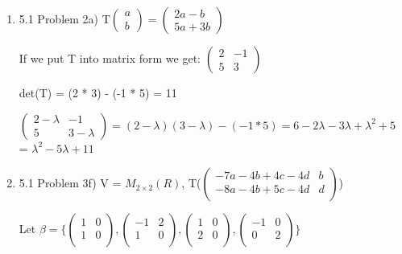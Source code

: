 \documentclass[12pt]{article}
\begin{document}
\begin{enumerate}
    [L$_A$]$_\beta$ = $\begin{pmatrix}
        3 & 0 \\
        0 & -1\\
    \end{pmatrix}$

    Q will just be the matrix form of the ordered basis vectors of $\beta$: \\
    Q = $\begin{pmatrix}
        1 & 1 \\
        1 & -1 \\
    \end{pmatrix}$
    
    \item 5.1 Problem 2a) T$\begin{pmatrix}
        a \\
        b 
    \end{pmatrix} = \begin{pmatrix}
        2a - b \\
        5a + 3b
    \end{pmatrix}$

    If we put T into matrix form we get: $\begin{pmatrix}
        2 & -1 \\
        5 & 3
    \end{pmatrix}$
    
    det(T) = (2 * 3) - (-1 * 5) = 11

    $\begin{pmatrix}
        2 - \lambda & -1 \\
        5 & 3 - \lambda
    \end{pmatrix} = (2 - \lambda)(3-\lambda) -(-1 * 5) = 6 - 2\lambda - 3\lambda + \lambda^2 + 5$ \\ = 
    $\lambda^2 - 5\lambda + 11$


    \item 5.1 Problem 3f) 
    V = $M_{2 \times 2}(R)$, T($\begin{pmatrix}
        -7a - 4b + 4c - 4d & b \\
        -8a - 4b + 5c - 4d & d\\
    \end{pmatrix}$)

    Let $\beta = \{ \begin{pmatrix}
        1 & 0 \\
        1 & 0 \\
    \end{pmatrix}, \begin{pmatrix}
        -1 & 2 \\
        1 & 0 \\
    \end{pmatrix}, \begin{pmatrix}
        1 & 0 \\
        2 & 0 \\
    \end{pmatrix}, \begin{pmatrix}
        -1 & 0 \\
        0 & 2 \\
    \end{pmatrix} \}$
    

\end{enumerate}
\end{document}
